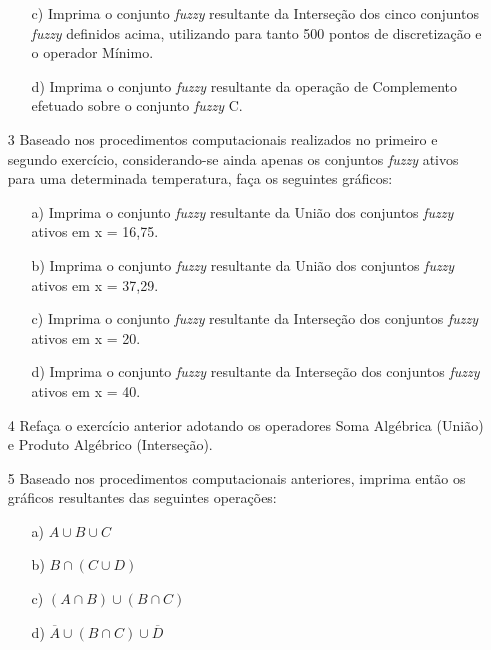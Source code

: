 \documentclass{report}
\begin{document}
\begin{enumerate}
\begin{enumerate}
\item[c)] Imprima o conjunto \emph{fuzzy} resultante da Interseção dos cinco conjuntos \emph{fuzzy} definidos
acima, utilizando para tanto 500 pontos de discretização e o operador Mínimo.


\item[d)] Imprima o conjunto \emph{fuzzy} resultante da operação de Complemento efetuado sobre o
conjunto \emph{fuzzy} C. 
\end{enumerate}



\item[3] Baseado nos procedimentos computacionais realizados no primeiro e segundo exercício,
considerando-se ainda apenas os conjuntos \emph{fuzzy} ativos para uma determinada temperatura,
faça os seguintes gráficos:
\begin{enumerate}
\item[a)] Imprima o conjunto \emph{fuzzy} resultante da União dos conjuntos \emph{fuzzy} ativos em x = 16,75.
\item[b)] Imprima o conjunto \emph{fuzzy} resultante da União dos conjuntos \emph{fuzzy} ativos em x = 37,29.
\item[c)] Imprima o conjunto \emph{fuzzy} resultante da Interseção dos conjuntos \emph{fuzzy} ativos em x = 20.
\item[d)] Imprima o conjunto \emph{fuzzy} resultante da Interseção dos conjuntos \emph{fuzzy} ativos em x = 40.
\end{enumerate}


\item[4] Refaça o exercício anterior adotando os operadores Soma Algébrica (União) e Produto
Algébrico (Interseção).


\item[5] Baseado nos procedimentos computacionais anteriores, imprima então os gráficos resultantes
das seguintes operações:

\begin{enumerate}
\item[a)] $A \cup B \cup C$
\item[b)] $B \cap (C\cup D)$
\item[c)] $(A \cap B) \cup (B \cap C)$
\item[d)] $\overline{A}\cup (B\cap C) \cup \overline{D}$
\end{enumerate}


\end{enumerate}
\end{document}
